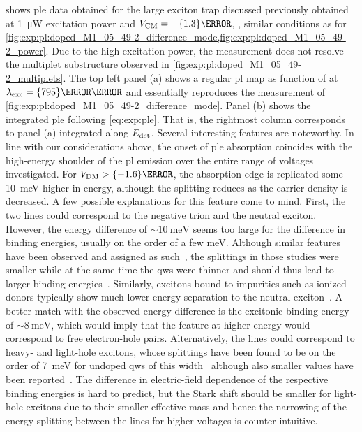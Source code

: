 shows \gls{ple} data obtained for the large exciton trap discussed previously obtained at \qty{1}{\micro\watt} excitation power and $\VCM = -\qty{1.3}{\volt}$, \ie, similar conditions as for \cref{fig:exp:pl:doped_M1_05_49-2_difference_mode,fig:exp:pl:doped_M1_05_49-2_power}.
Due to the high excitation power, the measurement does not resolve the multiplet substructure observed in \cref{fig:exp:pl:doped_M1_05_49-2_multiplets}.
The top left panel (a) shows a regular \gls{pl} map as function of \VDM at $\lambda_{\mr{exc}} = \qty{795}{\nano\meter}$ and essentially reproduces the measurement of \cref{fig:exp:pl:doped_M1_05_49-2_difference_mode}.
Panel (b) shows the integrated \gls{ple} following \cref{eq:exp:ple}.
That is, the rightmost column corresponds to panel (a) integrated along $E_{\mathrm{det}}$.
Several interesting features are noteworthy.
In line with our considerations above, the onset of \gls{ple} absorption coincides with the high-energy shoulder of the \gls{pl} emission over the entire range of voltages investigated.
For $\VDM > \qty{-1.6}{\volt}$, the absorption edge is replicated some \qty{10}{\milli\electronvolt} higher in energy, although the splitting reduces as the carrier density is decreased.
A few possible explanations for this feature come to mind.
First, the two lines could correspond to the negative trion and the neutral exciton.
However, the energy difference of $\sim\qty{10}{\milli\electronvolt}$ seems too large for the difference in binding energies, usually on the order of a few \unit{\milli\electronvolt}.
Although similar features have been observed and assigned as such~\cite{Brown1996,Huard2000,Yusa2000}, the splittings in those studies were smaller while at the same time the \glspl{qw} were thinner and should thus lead to larger binding energies~\cite{Esser2000,Esser2001}.
Similarly, excitons bound to impurities such as ionized donors typically show much lower energy separation to the neutral exciton~\cite{Essaoudi2001}.
A better match with the observed energy difference is the excitonic binding energy of $\sim\qty{8}{\milli\electronvolt}$, which would imply that the feature at higher energy would correspond to free electron-hole pairs.
Alternatively, the lines could correspond to heavy- and light-hole excitons, whose splittings have been found to be on the order of \qty{7}{\milli\electronvolt} for undoped \glspl{qw} of this width~\cite{ElKhalifi1989} although also smaller values have been reported~\cite{Bataev2022}.
The difference in electric-field dependence of the respective binding energies is hard to predict, but the Stark shift should be smaller for light-hole excitons due to their smaller effective mass and hence the narrowing of the energy splitting between the lines for higher voltages is counter-intuitive.
